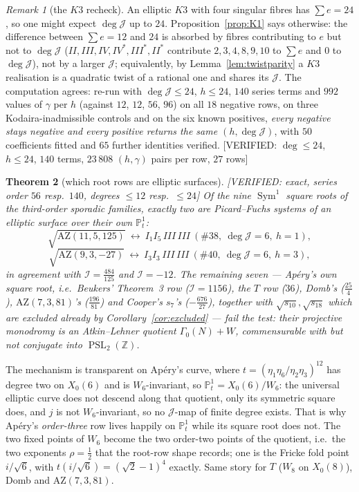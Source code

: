 \documentclass[11pt,reqno]{amsart}
\theoremstyle{plain}
\newtheorem{theorem}{Theorem}[section]
\theoremstyle{definition}
\theoremstyle{remark}
\newtheorem{remark}[theorem]{Remark}
\theoremstyle{plain}
\newcommand{\Z}{\mathbb{Z}}
\newcommand{\PP}{\mathbb{P}}
\DeclareMathOperator{\PSL}{PSL}
\DeclareMathOperator{\Sym}{Sym}
\newcommand{\VerifiedR}[1]{\textup{\textsf{[VERIFIED: #1]}}}
\begin{document}
\begin{remark}[the $K3$ recheck]
An elliptic $K3$ with four singular fibres has $\sum e=24$, so one might expect
$\deg\mathcal J$ up to $24$. Proposition~\ref{prop:K1} says otherwise: the
difference between $\sum e=12$ and $24$ is absorbed by fibres contributing to $e$
but not to $\deg\mathcal J$ ($II,III,IV,IV^*,III^*,II^*$ contribute
$2,3,4,8,9,10$ to $\sum e$ and $0$ to $\deg\mathcal J$), not by a larger
$\mathcal J$; equivalently, by Lemma~\ref{lem:twistparity} a $K3$ realisation is
a quadratic twist of a rational one and shares its $\mathcal J$. The computation agrees: re-run with $\deg\mathcal J\le24$,
$h\le24$, $140$ series terms and $992$ values of $\gamma$ per $h$ (against $12$,
$12$, $56$, $96$) on all $18$ negative rows, on three Kodaira-inadmissible
controls and on the six known positives, \emph{every negative stays negative and
every positive returns the same $(h,\deg\mathcal J)$}, with $50$ coefficients
fitted and $65$ further identities verified.
\VerifiedR{$\deg\le24$, $h\le24$, $140$ terms, $23\,808$ $(h,\gamma)$ pairs per
row, $27$ rows}
\end{remark}

\begin{theorem}[which root rows are elliptic surfaces]\label{thm:whichroots}
\VerifiedR{exact, series order $56$ resp.\ $140$, degrees $\le12$ resp.\ $\le24$}
Of the nine $\Sym^1$ square roots of the third-order sporadic families, exactly
two are Picard--Fuchs systems of an elliptic surface over their own $\PP^1_t$:
\[
\sqrt{\mathrm{AZ}(11,5,125)}\ \leftrightarrow\ I_1I_5\,III\,III\ (\#38,\ \deg\mathcal J=6,\ h=1),
\]
\[
\sqrt{\mathrm{AZ}(9,3,-27)}\ \leftrightarrow\ I_3I_3\,III\,III\ (\#40,\ \deg\mathcal J=6,\ h=3),
\]
in agreement with $\mathcal I=\tfrac{484}{125}$ and $\mathcal I=-12$. The
remaining seven --- Ap\'ery's own square root, i.e.\ Beukers' Theorem~3 row
($\mathcal I=1156$), the $T$ row ($36$), Domb's ($\tfrac{25}4$),
$\mathrm{AZ}(7,3,81)$'s ($\tfrac{196}{81}$) and Cooper's $s_7$'s
($-\tfrac{676}{27}$), together with $\sqrt{s_{10}},\sqrt{s_{18}}$ which are
excluded already by Corollary~\ref{cor:excluded} --- fail the test: their
projective monodromy is an Atkin--Lehner quotient $\Gamma_0(N)+W$, commensurable
with but not conjugate into $\PSL_2(\Z)$.
\end{theorem}

The mechanism is transparent on Ap\'ery's curve, where
$t=(\eta_1\eta_6/\eta_2\eta_3)^{12}$ has degree two on $X_0(6)$ and is
$W_6$-invariant, so $\PP^1_t=X_0(6)/W_6$: the universal elliptic curve does not
descend along that quotient, only its symmetric square does, and $j$ is not
$W_6$-invariant, so no $\mathcal J$-map of finite degree exists. That is why
Ap\'ery's \emph{order-three} row lives happily on $\PP^1_t$ while its square root
does not. The two fixed points of $W_6$ become the two order-two points of the
quotient, i.e.\ the two exponents $\rho=\tfrac12$ that the root-row shape
records; one is the Fricke fold point $i/\sqrt6$, with
$t(i/\sqrt6)=(\sqrt2-1)^4$ exactly. Same story for $T$ ($W_8$ on $X_0(8)$), Domb
and $\mathrm{AZ}(7,3,81)$.
\end{document}
